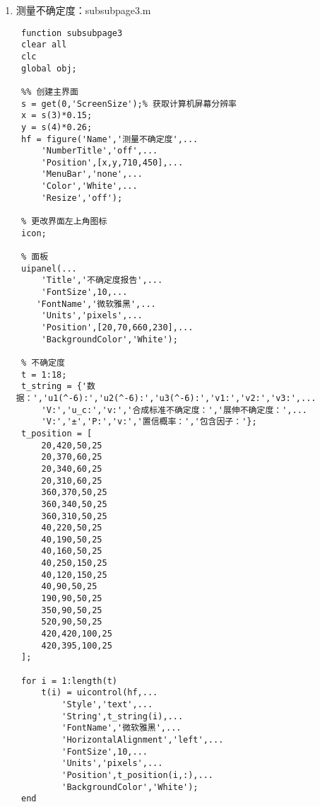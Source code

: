 \begin{enumerate}
\begin{lstlisting}
 % 按钮
 b = [uicontrol(hf,'CallBack',@run1),uicontrol(hf,'CallBack','page_exit')];
 b_string = {'计算','返回'};
 b_position = [
     430,10,80,25
     520,10,80,25
 ];
 
 for i = 1:length(b)
     set(b(i),...
         'Style','pushbutton',...
         'String',b_string(i),...
         'FontName','微软雅黑',...
         'FontSize',10,...
         'Units','pixels',...
         'Position',b_position(i,:));
 end
 
 obj = findobj(gcf);
 
 function run1(a,b)
 global obj;
 a = str2num(get(obj(6),'String'));
 delta = str2num(get(obj(5),'String'));
 if isempty(a)||isempty(delta)
 	warndlg('缺少输入参数！');
 	return;
 end
 result = error_combination(a,delta);
 set(obj(4),'String',num2str(result));\end{lstlisting}
	\item 测量不确定度：subsubpage3.m
	\begin{lstlisting}
 function subsubpage3
 clear all
 clc
 global obj;
 
 %% 创建主界面
 s = get(0,'ScreenSize');% 获取计算机屏幕分辨率
 x = s(3)*0.15;
 y = s(4)*0.26;
 hf = figure('Name','测量不确定度',...
     'NumberTitle','off',...
     'Position',[x,y,710,450],...
     'MenuBar','none',...
     'Color','White',...
     'Resize','off');
 
 % 更改界面左上角图标
 icon;
 
 % 面板
 uipanel(...
     'Title','不确定度报告',...
     'FontSize',10,...
 	'FontName','微软雅黑',...
     'Units','pixels',...
     'Position',[20,70,660,230],...
     'BackgroundColor','White');
 
 % 不确定度
 t = 1:18;
 t_string = {'数据：','u1(^-6):','u2(^-6):','u3(^-6):','v1:','v2:','v3:',...
     'V:','u_c:','v:','合成标准不确定度：','展伸不确定度：',...
     'V:','±','P:','v:','置信概率：','包含因子：'};
 t_position = [
     20,420,50,25
     20,370,60,25
     20,340,60,25
     20,310,60,25
     360,370,50,25
     360,340,50,25
     360,310,50,25
     40,220,50,25
     40,190,50,25
     40,160,50,25
     40,250,150,25
     40,120,150,25
     40,90,50,25
     190,90,50,25
     350,90,50,25
     520,90,50,25
     420,420,100,25
     420,395,100,25
 ];
 
 for i = 1:length(t)
     t(i) = uicontrol(hf,...
         'Style','text',...
         'String',t_string(i),...
         'FontName','微软雅黑',...
         'HorizontalAlignment','left',...
         'FontSize',10,...
         'Units','pixels',...
         'Position',t_position(i,:),...
         'BackgroundColor','White');
 end
 

\end{lstlisting}
\end{enumerate}
